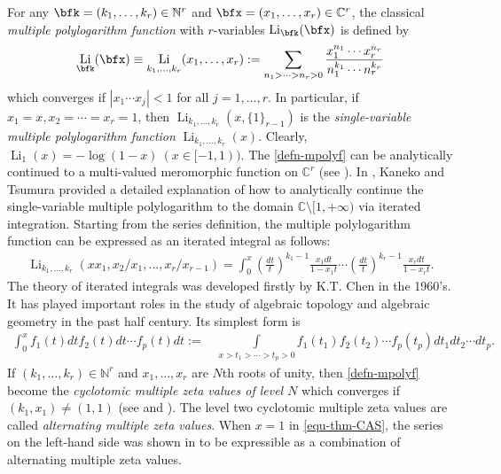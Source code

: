 \documentclass[11pt]{article}
\DeclareMathOperator{\Li}{Li}
\def\N{\mathbb{N}}
\theoremstyle{plain}
\theoremstyle{definition}
\begin{document}
For any $\bfk=(k_1,\dotsc,k_r)\in\N^r$ and $\bfx=(x_1,\ldots,x_r)\in \mathbb{C}^r$, the classical \emph{multiple polylogarithm function} with $r$-variables $\Li_{\bfk}(\bfx)$ is defined by
\begin{align}\label{defn-mpolyf}
\Li_{\bfk}(\bfx)\equiv \Li_{k_1,\dotsc,k_r}(x_1,\dotsc,x_r):=\sum_{n_1>\cdots>n_r>0} \frac{x_1^{n_1}\dotsm x_r^{n_r}}{n_1^{k_1}\dotsm n_r^{k_r}}
\end{align}
which converges if $|x_1\cdots x_j|<1$ for all $j=1,\dotsc,r$. In particular, if $x_1=x,x_2=\cdots=x_r=1$, then $\Li_{k_1,\ldots,k_r}(x,\{1\}_{r-1})$ is the \emph{single-variable multiple polylogarithm function} $\Li_{k_1,\ldots,k_r}(x)$. Clearly, $\Li_1(x)=-\log(1-x)\ (x\in[-1,1))$.
The \eqref{defn-mpolyf} can be analytically continued to a multi-valued meromorphic function on $\mathbb{C}^r$ (see \cite{KMT2023,Zhao2007d,Zhao2010}). In \cite[Lemma 2.2]{KT2018}, Kaneko and Tsumura provided a detailed explanation of how to analytically continue the single-variable multiple polylogarithm to the domain $\mathbb{C}\setminus[1,+\infty)$ via iterated integration. Starting from the series definition, the multiple polylogarithm function can be expressed as an iterated integral as follows:
\begin{align}
\Li_{k_1,\ldots,k_r}(xx_1,x_2/x_1,\ldots,x_r/x_{r-1})=\int_0^x \left(\frac{dt}{t}\right)^{k_1-1}\frac{x_1dt}{1-x_1t}\cdots \left(\frac{dt}{t}\right)^{k_r-1}\frac{x_rdt}{1-x_rt}.
\end{align}
The theory of iterated integrals was developed firstly by K.T. Chen in the 1960's. It has played important roles in the study of algebraic topology and algebraic geometry in the past half century. Its simplest form is
\begin{align*}
\int_0^x f_1(t)dtf_{2}(t)dt\cdots f_p(t)dt:=&\, \int\limits_{x>t_1>\cdots>t_p>0}f_1(t_1)f_{2}(t_{2})\cdots f_p(t_p)dt_1dt_2\cdots dt_p.
\end{align*}
If $(k_1,\dotsc, k_r)\in\N^r$ and $x_1,\ldots,x_r$ are $N$th roots of unity, then \eqref{defn-mpolyf} become the \emph{cyclotomic multiple zeta values of level $N$} which converges if $(k_1,x_1)\ne (1,1)$ (see \cite{YuanZh2014a} and \cite[Ch. 15]{Z2016}). The level two cyclotomic multiple zeta values are called \emph{alternating multiple zeta values}. When $x=1$ in \eqref{equ-thm-CAS}, the series on the left-hand side was shown in \cite[Theorem 2.2]{WX2021} to be expressible as a combination of alternating multiple zeta values.
\end{document}
